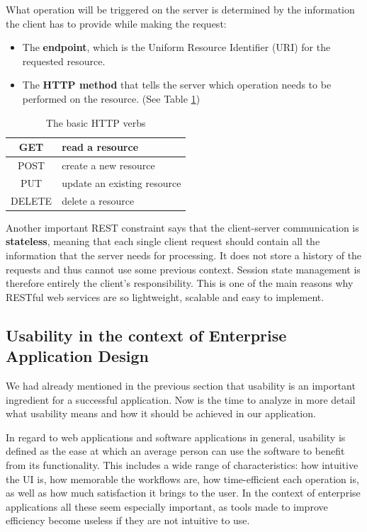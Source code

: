 What operation will be triggered on the server is determined by the information the client has to provide while making the request:

\begin{itemize}
    \item The \textbf{endpoint}, which is the Uniform Resource Identifier (URI) for the requested resource.
    \item The \textbf{HTTP method} that tells the server which operation needs to be performed on the resource. (See Table \ref{httpVerbs})
\end{itemize}

\begin{table}[H]
    \centering
    \begin{tabular}{|c|l|}
        \hline
        GET    & read a resource             \\ \hline
        POST   & create a new resource       \\ \hline
        PUT    & update an existing resource \\ \hline
        DELETE & delete a resource           \\ \hline
    \end{tabular}
    \caption{The basic HTTP verbs}
    \label{httpVerbs}
\end{table}

Another important REST constraint says that the client-server communication is \textbf{stateless}, meaning that each single client request should contain all the information that the server needs for processing. It does not store a history of the requests and thus cannot use some previous context. Session state management is therefore entirely the client's responsibility. This is one of the main reasons why RESTful web services are so lightweight, scalable and easy to implement.


\subsection{Usability in the context of Enterprise Application Design}
\label{subsection:usability}

We had already mentioned in the previous section that usability is an important ingredient for a successful application. Now is the time to analyze in more detail what usability means and how it should be achieved in our application.

In regard to web applications and software applications in general, usability is defined as the ease at which an average person can use the software to benefit from its functionality. This includes a wide range of characteristics: how intuitive the UI is, how memorable the workflows are, how time-efficient each operation is, as well as how much satisfaction it brings to the user. In the context of enterprise applications all these seem especially important, as tools made to improve efficiency become useless if they are not intuitive to use.

